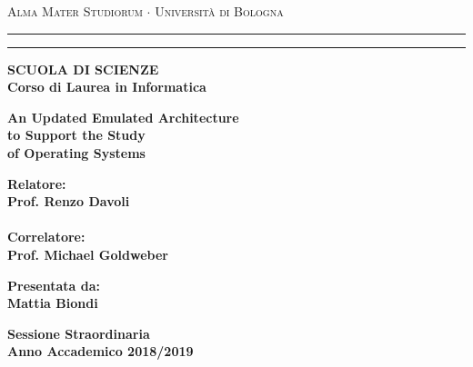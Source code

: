 \documentclass[12pt,a4paper,openright,twoside]{report}
\begin{document}
\begin{titlepage}
	\begin{center}
		{{\Large{\textsc{Alma Mater Studiorum $\cdot$ Università di
							Bologna}}}} \rule[0.1cm]{15.8cm}{0.1mm}
		\rule[0.5cm]{15.8cm}{0.6mm}
		{\small{\bf SCUOLA DI SCIENZE\\
				Corso di Laurea in Informatica }}
	\end{center}
	\vspace{15mm}
	\begin{center}
		{\LARGE{\bf An Updated Emulated Architecture}}\\
		\vspace{3mm}
		{\LARGE{\bf to Support the Study}}\\
		\vspace{3mm}
		{\LARGE{\bf of Operating Systems}}\\
	\end{center}
	\vspace{40mm}
	\par
	\noindent
	\begin{minipage}[t]{0.47\textwidth}
		{\large{\bf Relatore:\\
				Prof. Renzo Davoli\\\\
				Correlatore:\\
				Prof. Michael Goldweber}}
	\end{minipage}
	\hfill
	\begin{minipage}[t]{0.47\textwidth}\raggedleft
		{\large{\bf Presentata da:\\
				Mattia Biondi}}
	\end{minipage}
	\vspace{20mm}
	\begin{center}
		{\large{\bf Sessione Straordinaria\\
				Anno Accademico 2018/2019}}
	\end{center}
\end{titlepage}
\end{document}

